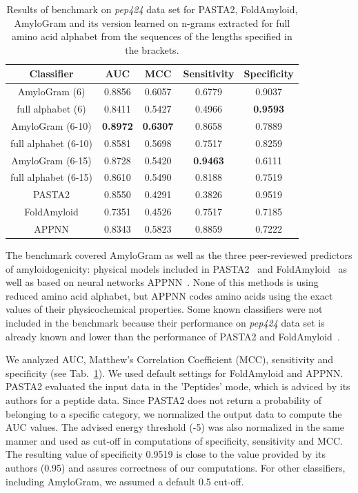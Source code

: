 \documentclass[fleqn,10pt,twoside]{gcb15submission}
\begin{document}
\begin{table}[ht]
\centering
\small
\caption{Results of benchmark on \textit{pep424} data set for PASTA2, 
FoldAmyloid, AmyloGram and its version learned on n-grams extracted for full amino acid alphabet from the sequences of the lengths specified in 
the brackets.} 
\label{tab:bench_summary}
\begin{tabular}{ccccc}
  \toprule
Classifier & AUC & MCC & Sensitivity & Specificity \\ 
  \midrule
AmyloGram (6) & 0.8856 & 0.6057 & 0.6779 & 0.9037 \\
   \rowcolor[gray]{0.85}full alphabet (6) & 0.8411 & 0.5427 & 0.4966 & 
\textbf{0.9593} \\ 

AmyloGram (6-10) & \textbf{0.8972} & \textbf{0.6307} & 
0.8658 & 0.7889 \\ 
  \rowcolor[gray]{0.85}full alphabet (6-10) & 0.8581 & 0.5698 & 0.7517 & 0.8259 
\\ 
AmyloGram (6-15) & 0.8728 & 0.5420 & \textbf{0.9463} & 0.6111 \\
   \rowcolor[gray]{0.85}full alphabet (6-15) & 0.8610 & 0.5490 & 0.8188 & 
0.7519 \\ 
\hline \hline
  PASTA2 & 0.8550 & 0.4291 & 0.3826 & 0.9519 \\ 
   \rowcolor[gray]{0.85}FoldAmyloid & 0.7351 & 0.4526 & 0.7517 & 0.7185 \\ 
  APPNN & 0.8343 & 0.5823 & 0.8859 & 0.7222 \\ 
   \bottomrule
\end{tabular}
\end{table}

The benchmark covered AmyloGram as well as the three peer-reviewed predictors of 
amyloidogenicity: physical models included in PASTA2~\citep{walsh_pasta_2014} and 
FoldAmyloid~\citep{garbuzynskiy_foldamyloid:_2010} as well as based on neural networks 
APPNN~\citep{familia_prediction_2015}. None of this methods is using 
reduced amino acid alphabet, but APPNN codes amino acids using the exact 
values of their physicochemical properties. Some known classifiers were 
not included in the benchmark because their performance on \textit{pep424} 
data set is already known and lower than the performance of PASTA2 and 
FoldAmyloid~\citep{walsh_pasta_2014}.

  We analyzed AUC, Matthew's Correlation Coefficient (MCC), sensitivity and 
specificity (see Tab.~\ref{tab:bench_summary}). We used default settings for 
FoldAmyloid and APPNN. PASTA2 evaluated the input data in the 'Peptides' mode, 
which is adviced by its authors for a peptide data. Since PASTA2 does not 
return a probability of belonging to a specific 
category, we normalized the output data to compute the AUC values. The advised 
energy threshold (-5) was also normalized in the same manner and used as cut-off 
in computations of specificity, sensitivity and MCC. The resulting value of 
specificity 0.9519 is close to the value provided by its authors (0.95) and 
assures correctness of our computations. For other classifiers, including 
AmyloGram, we assumed a default 0.5 cut-off.
    
\end{document}
